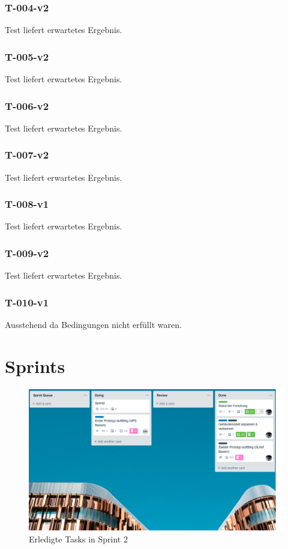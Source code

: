 \documentclass[a4paper]{scrreprt}
\begin{document}
\subsection{T-004-v2}
Test liefert erwartetes Ergebnis.
\subsection{T-005-v2}
Test liefert erwartetes Ergebnis.
\subsection{T-006-v2}
Test liefert erwartetes Ergebnis.
\subsection{T-007-v2}
Test liefert erwartetes Ergebnis.
\subsection{T-008-v1}
Test liefert erwartetes Ergebnis.
\subsection{T-009-v2}
Test liefert erwartetes Ergebnis.
\subsection{T-010-v1}
Ausstehend da Bedingungen nicht erfüllt waren.


\chapter{Sprints}

\begin{figure}[h!]
	\includegraphics[keepaspectratio,width=\textwidth]{SprintReview_2}
	\caption{Erledigte Tasks in Sprint 2}
\end{figure}
\end{document}
